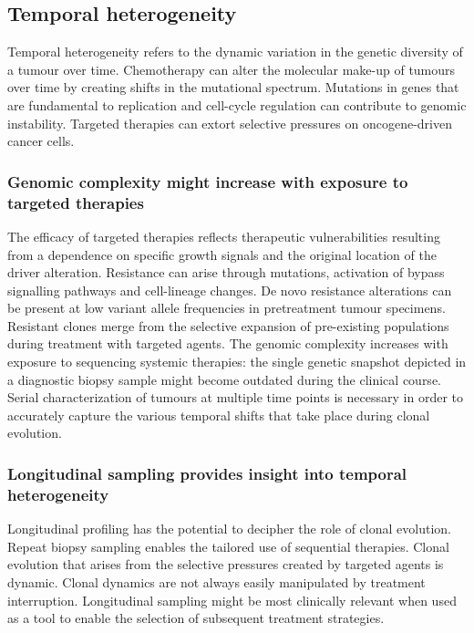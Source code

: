 	\subsection{Temporal heterogeneity}
	Temporal heterogeneity refers to the dynamic variation in the genetic diversity of a tumour over time.
	Chemotherapy can alter the molecular make-up of tumours over time by creating shifts in the mutational spectrum.
	Mutations in genes that are fundamental to replication and cell-cycle regulation can contribute to genomic instability.
	Targeted therapies can extort selective pressures on oncogene-driven cancer cells.

		\subsubsection{Genomic complexity might increase with exposure to targeted therapies}
		The efficacy of targeted therapies reflects therapeutic vulnerabilities resulting from a dependence on specific growth signals and the original location of the driver alteration.
		Resistance can arise through mutations, activation of bypass signalling pathways and cell-lineage changes.
		De novo resistance alterations can be present at low variant allele frequencies in pretreatment tumour specimens.
		Resistant clones merge from the selective expansion of pre-existing populations during treatment with targeted agents.
		The genomic complexity increases with exposure to sequencing systemic therapies: the single genetic snapshot depicted in a diagnostic biopsy sample might become outdated during the clinical course.
		Serial characterization of tumours at multiple time points is necessary in order to accurately capture the various temporal shifts that take place during clonal evolution.

		\subsubsection{Longitudinal sampling provides insight into temporal heterogeneity}
		Longitudinal profiling has the potential to decipher the role of clonal evolution.
		Repeat biopsy sampling enables the tailored use of sequential therapies.
		Clonal evolution that arises from the selective pressures created by targeted agents is dynamic.
		Clonal dynamics are not always easily manipulated by treatment interruption.
		Longitudinal sampling might be most clinically relevant when used as a tool to enable the selection of subsequent treatment strategies.

